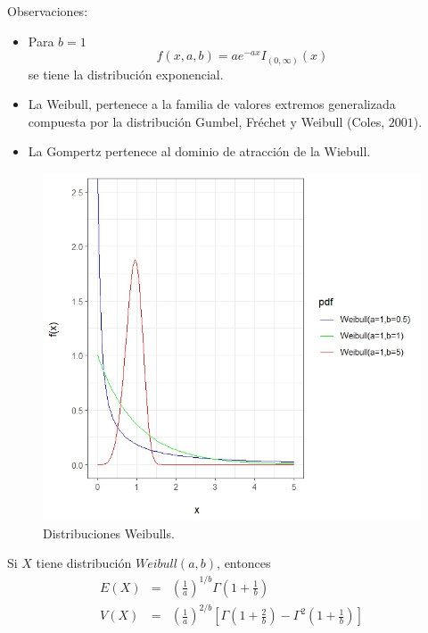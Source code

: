 \begin{i}
Observaciones:
\begin{itemize}
\item Para $b=1$
\begin{equation*}
f(x,a,b)=ae^{-ax}I_{(0,\infty )}(x)
\end{equation*}
se tiene la distribución exponencial.

\item La Weibull, pertenece a la familia de valores extremos generalizada compuesta por la distribución Gumbel, Fréchet y Weibull (Coles, $2001$).

\item La Gompertz pertenece al dominio de atracción de la Wiebull.
\end{itemize}

\begin{figure}[h!]
\centering
\includegraphics[scale=1]{Figuras/Weibulls.jpeg}
\caption{Distribuciones Weibulls.}
\end{figure}

\begin{theorem}
Si $X$ tiene distribución $Weibull(a,b)$, entonces
\begin{eqnarray*}
E(X) &=&\left( \frac{1}{a}\right) ^{1/b}\Gamma \left( 1+\frac{1}{b}\right) \\
V(X) &=&\left( \frac{1}{a}\right) ^{2/b}\left[ \Gamma \left( 1+\frac{2}{b}
\right) -\Gamma ^{2}\left( 1+\frac{1}{b}\right) \right]
\end{eqnarray*}
\end{theorem}


\end{i}
